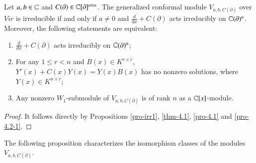 \documentclass[12pt]{amsart}
\begin{document}
\begin{thm}\label{thm-c}Let $a,b\in\mathbb{C}$ and $C(\partial)\in\mathbb{C}[\partial]^{n\times n}$.
The generalized conformal module
$V_{a,b,C(\partial)}$ over $Vir$ is irreducible if and only if $a\neq 0$ and
$\frac{d}{dx}+C(\partial)$ acts irreducibly on $\mathbb{C}(\partial)^n$. Moreover, the following statements are equivalent:
\begin{enumerate}
\item $\frac{d}{dx}+C(\partial)$ acts irreducibly on $\mathbb{C}(\partial)^n$;
\item For any $1\leq r<n$ and $B(x)\in K^{r\times r}$,
$Y'(x)+C(x)Y(x)=Y(x)B(x)$ has no nonzero solutions, where $Y(x)\in K^{n\times r}$;
\item Any nonzero $W_1$-submodule of $V_{a,b,C(\partial)}$ is of rank $n$ as a $\mathbb{C}[x]$-module.
\end{enumerate}
\end{thm}
\begin{proof}
It follows directly by Propositions \ref{pro-irr1}, \ref{thm-4.1},  \ref{pro-4.1} and \ref{pro-4.2-1}.
\end{proof}

The following proposition characterizes the isomorphism classes of the modules $V_{a,b,C(\partial)}$.
\end{document}
